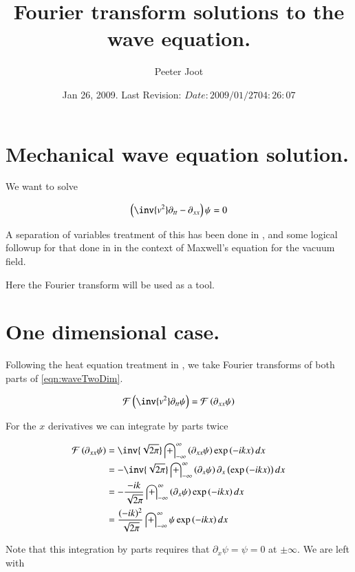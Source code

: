 \documentclass{article}
\title{ Fourier transform solutions to the wave equation. }
\author{Peeter Joot}
\date{ Jan 26, 2009.  Last Revision: $Date: 2009/01/27 04:26:07 $ }
\newcommand{\FF}[0]{\mathcal{F}}
\newcommand{\IIinf}[0]{ \int_{-\infty}^\infty }
\begin{document}
\maketitle{}

\tableofcontents
\section{ Mechanical wave equation solution. }

We want to solve

\begin{align}\label{eqn:waveTwoDim}
\left(\inv{v^2} \partial_{tt} - \partial_{xx}\right) \psi = 0
\end{align}

A separation of variables treatment of this has been done in
\cite{PJwaveFourVector}, and some logical followup for that done in
\cite{PJemWave} in the context of Maxwell's equation for the vacuum field.

Here the Fourier transform will be used as a tool.

\section{ One dimensional case. }

Following the heat equation treatment in \cite{PJheatFourier}, we take Fourier transforms 
of both parts of \ref{eqn:waveTwoDim}.

\begin{align*}
\FF\left( \inv{v^2} \partial_{tt} \psi \right) = \FF\left( \partial_{xx} \psi \right)
\end{align*}

For the $x$ derivatives we can integrate by parts twice

\begin{align*}
\FF\left( \partial_{xx} \psi \right)
&= \inv{\sqrt{2 \pi}} \IIinf \left( \partial_{xx} \psi \right) \exp\left( -i k x \right) dx \\
&= -\inv{\sqrt{2 \pi}} \IIinf \left( \partial_{x} \psi \right) \partial_x\left(\exp\left( -i k x \right) \right) dx \\
&= -\frac{-i k}{\sqrt{2 \pi}} \IIinf \left( \partial_{x} \psi \right) \exp\left( -i k x \right) dx \\
&= \frac{(-i k)^2}{\sqrt{2 \pi}} \IIinf \psi \exp\left( -i k x \right) dx \\
\end{align*}

Note that this integration by parts requires that $\partial_x \psi = \psi = 0$ at $\pm \infty$.  We are left with 
\end{document}
